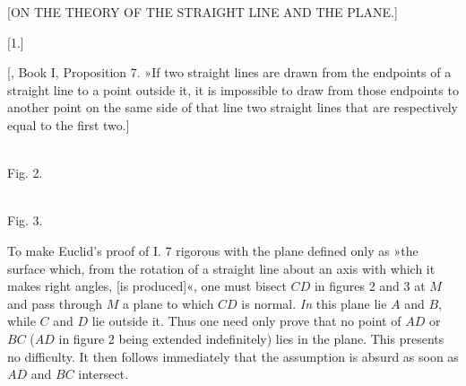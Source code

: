 \clearpage{}
\begin{center}[ON THE THEORY OF THE STRAIGHT LINE AND THE PLANE.]\end{center}


\begin{center}[1.]\end{center}


[, Book I, Proposition 7. »If two straight lines are drawn from
the endpoints of a straight line to a point outside it, it is impossible to draw from those
endpoints to another point on the same side of that line two straight lines
that are respectively equal to the first two.]

\begin{center}
\begin{minipage}[b]{.42\linewidth}\centering\\[3pt]Fig. 2.\end{minipage}\hfill
\begin{minipage}[b]{.42\linewidth}\centering\\[3pt]Fig. 3.\end{minipage}
\end{center}
To make Euclid's proof of I. 7 rigorous with the plane defined only as
»the surface which, from the rotation of a straight line about an axis
with which it makes right angles, [is produced]«, one must bisect $CD$ in figures 2 and 3
at $M$ and pass through $M$ a plane to which $CD$ is normal.
\emph{In} this plane lie $A$ and $B$, while $C$ and $D$ lie outside it. Thus
one need only prove that no point of $AD$ or $BC$ ($AD$ in
figure 2 being extended indefinitely) lies in the plane. This presents no difficulty.
It then follows immediately that the assumption is absurd as soon as $AD$ and
$BC$ intersect.

